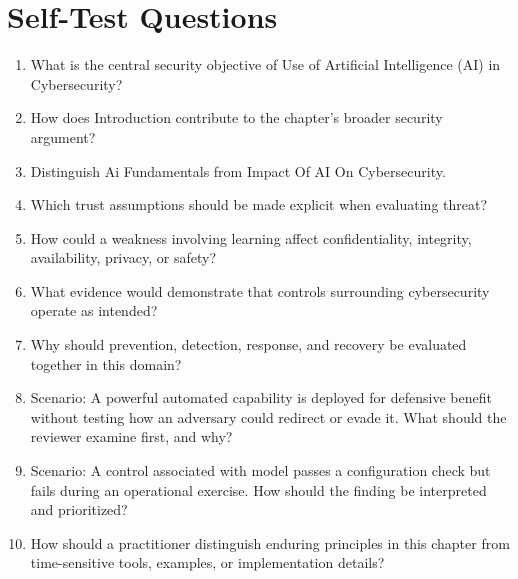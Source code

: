 \documentclass[11pt]{article}
\begin{document}
\section*{Self-Test Questions}
\begin{enumerate}
\item What is the central security objective of Use of Artificial Intelligence (AI) in Cybersecurity?
\item How does Introduction contribute to the chapter's broader security argument?
\item Distinguish Ai Fundamentals from Impact Of AI On Cybersecurity.
\item Which trust assumptions should be made explicit when evaluating threat?
\item How could a weakness involving learning affect confidentiality, integrity, availability, privacy, or safety?
\item What evidence would demonstrate that controls surrounding cybersecurity operate as intended?
\item Why should prevention, detection, response, and recovery be evaluated together in this domain?
\item Scenario: A powerful automated capability is deployed for defensive benefit without testing how an adversary could redirect or evade it. What should the reviewer examine first, and why?
\item Scenario: A control associated with model passes a configuration check but fails during an operational exercise. How should the finding be interpreted and prioritized?
\item How should a practitioner distinguish enduring principles in this chapter from time-sensitive tools, examples, or implementation details?
\end{enumerate}
\end{document}
